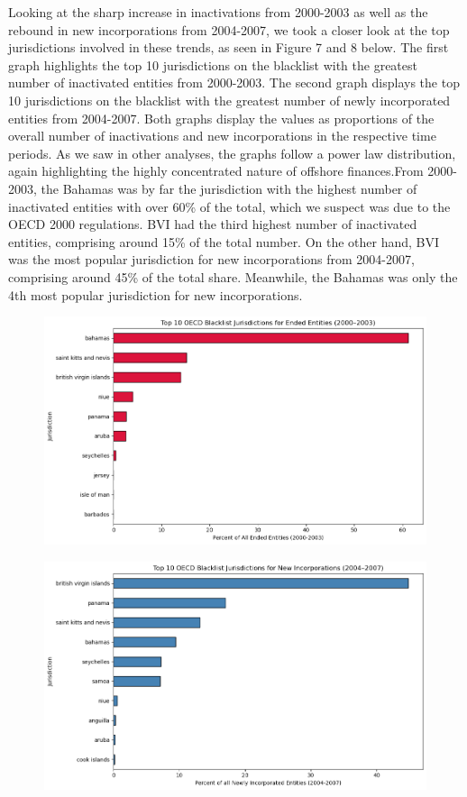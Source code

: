 \documentclass{article}
\begin{document}
Looking at the sharp increase in inactivations from 2000-2003 as well as the rebound in new incorporations from 2004-2007, we took a closer look at the top jurisdictions involved in these trends, as seen in Figure 7 and 8 below. The first graph highlights the top 10 jurisdictions on the blacklist with the greatest number of inactivated entities from 2000-2003. The second graph displays the top 10 jurisdictions on the blacklist with the greatest number of newly incorporated entities from 2004-2007. Both graphs display the values as proportions of the overall number of inactivations and new incorporations in the respective time periods. As we saw in other analyses, the graphs follow a power law distribution, again highlighting the highly concentrated nature of offshore finances.From 2000-2003, the Bahamas was by far the jurisdiction with the highest number of inactivated entities with over 60\% of the total, which we suspect was due to the OECD 2000 regulations. BVI had the third highest number of inactivated entities, comprising around 15\% of the total number. On the other hand, BVI was the most popular jurisdiction for new incorporations from 2004-2007, comprising around 45\% of the total share. Meanwhile, the Bahamas was only the 4th most popular jurisdiction for new incorporations.


\begin{figure}[H]
  \centering
    \caption{} 
  \label{fig:fig7}
  \includegraphics[width=\textwidth]{Figure 7.png}
\end{figure}

\begin{figure}[H]
  \centering
    \caption{} 
  \label{fig:fig8}
  \includegraphics[width=\textwidth]{Figure 8.png}
\end{figure}
\end{document}
